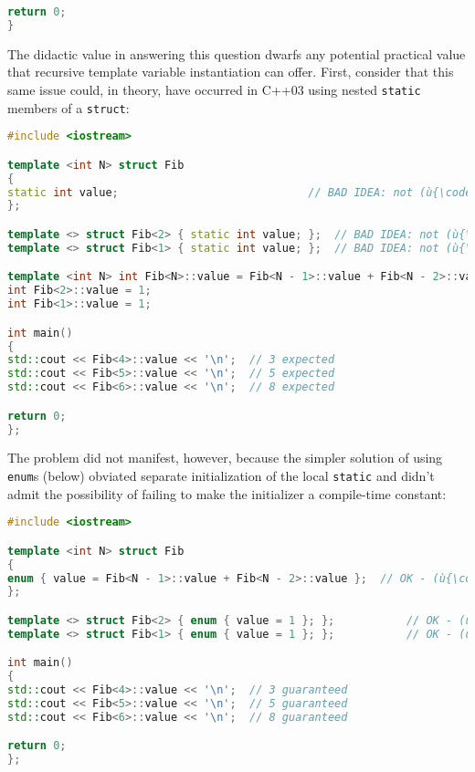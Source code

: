 {\begin{lstlisting}[language=C++]
return 0;
}
\end{lstlisting}

\noindent The didactic value in answering this question dwarfs any potential
practical value that recursive template variable instantiation can
offer. First, consider that this same issue could, in theory, have
occurred in C++03 using nested \texttt{static} members of a
\texttt{struct}:

\begin{lstlisting}[language=C++]
#include <iostream>

template <int N> struct Fib
{
static int value;                             // BAD IDEA: not (ù{\codeincomments{const}}ù)
};

template <> struct Fib<2> { static int value; };  // BAD IDEA: not (ù{\codeincomments{const}}ù)
template <> struct Fib<1> { static int value; };  // BAD IDEA: not (ù{\codeincomments{const}}ù)

template <int N> int Fib<N>::value = Fib<N - 1>::value + Fib<N - 2>::value;
int Fib<2>::value = 1;
int Fib<1>::value = 1;

int main()
{
std::cout << Fib<4>::value << '\n';  // 3 expected
std::cout << Fib<5>::value << '\n';  // 5 expected
std::cout << Fib<6>::value << '\n';  // 8 expected

return 0;
};
\end{lstlisting}

\noindent The problem did not manifest, however, because the simpler solution of
using \texttt{enum}s (below) obviated separate initialization of the
local \texttt{static} and didn't admit the possibility of failing to
make the initializer a compile-time constant:

\begin{lstlisting}[language=C++]
#include <iostream>

template <int N> struct Fib
{
enum { value = Fib<N - 1>::value + Fib<N - 2>::value };  // OK - (ù{\codeincomments{const}}ù)
};

template <> struct Fib<2> { enum { value = 1 }; };           // OK - (ù{\codeincomments{const}}ù)
template <> struct Fib<1> { enum { value = 1 }; };           // OK - (ù{\codeincomments{const}}ù)

int main()
{
std::cout << Fib<4>::value << '\n';  // 3 guaranteed
std::cout << Fib<5>::value << '\n';  // 5 guaranteed
std::cout << Fib<6>::value << '\n';  // 8 guaranteed

return 0;
};
\end{lstlisting}

}

